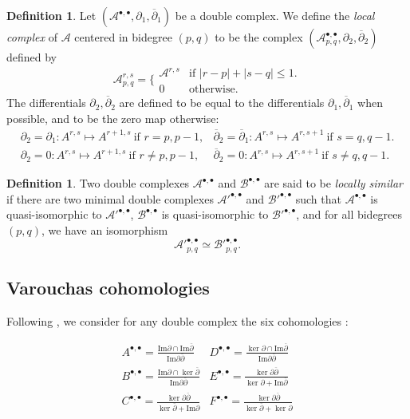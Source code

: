 \documentclass[leqno]{article}
\theoremstyle{definition}
\newtheorem{Definition}[equation]{Definition}
\numberwithin{equation}{section}
\begin{document}
\begin{Definition}
Let $(\mathcal{A}^{\bullet, \bullet}, \partial_1, \overline{\partial}_1)$ be a double complex. We define the {\sl local complex} of $\mathcal{A}$ centered in bidegree $(p, q)$ to be the complex $(\mathcal{A}_{p, q}^{\bullet, \bullet}, \partial_2, \overline{\partial}_2)$ defined by
\[
\mathcal{A}_{p, q}^{r, s}
=
\Bigg\{
\begin{array}{ccc}
\mathcal{A}^{r, s} & \text{if } |r-p| + |s - q| \leqslant 1. \\
0 & \text{otherwise}.
\end{array}
\]
The differentials $\partial_2, \overline{\partial}_2$ are defined to be equal to the differentials $\partial_1, \overline{\partial}_1$ when possible, and to be the zero map otherwise:
\[
\begin{array}{cccc}
\partial_2 = \partial_1 : A^{r, s} \mapsto A^{r+1, s} \ \text{if } r =p, p-1,
&
\overline{\partial}_2 = \overline{\partial}_1 : A^{r, s} \mapsto A^{r, s+1} \ \text{if } s =q, q-1.
\\
\partial_2 = 0 : A^{r, s} \mapsto A^{r+1, s} \ \text{if } r \neq p, p-1,
&
\overline{\partial}_2 = 0 : A^{r, s} \mapsto A^{r, s+1} \ \text{if } s \neq q, q-1.
\end{array}
\]
\end{Definition}
\begin{Definition}
Two double complexes $\mathcal{A}^{\bullet, \bullet}$ and $\mathcal{B}^{\bullet, \bullet}$ are said to be {\sl locally similar} if there are two minimal double complexes $\mathcal{A}'^{\bullet, \bullet}$ and $\mathcal{B}'^{\bullet, \bullet}$ such that $\mathcal{A}^{\bullet, \bullet}$ is quasi-isomorphic to $\mathcal{A}'^{\bullet, \bullet}$, $\mathcal{B}^{\bullet, \bullet}$ is quasi-isomorphic to $\mathcal{B}'^{\bullet, \bullet}$, and for all bidegrees $(p, q)$, we have an isomorphism
\[
\mathcal{A}'^{\bullet, \bullet}_{p, q}
\simeq
\mathcal{B}'^{\bullet, \bullet}_{p, q}.
\]
\end{Definition}

\subsection{Varouchas cohomologies}

Following \cite{JV}, we consider for any double complex the six cohomologies :

\[
\begin{array}{cc}
A^{\bullet, \bullet} = \frac{\text{Im} \partial \cap \text{Im} \overline{\partial}}{\text{Im} \partial \overline{\partial}} 
&
D^{\bullet, \bullet}= \frac{\ker \partial \cap \text{Im} \overline{\partial}}{\text{Im} \partial \overline{\partial}}
\\
B^{\bullet, \bullet} = \frac{\text{Im} \partial \cap \ker \overline{\partial}}{\text{Im} \partial \overline{\partial}}
&
E^{\bullet, \bullet} =  \frac{\ker \partial \overline{\partial}}{\ker \partial + \text{Im} \overline{\partial}}
\\
C^{\bullet, \bullet} = \frac{\ker \partial \overline{\partial}}{\ker \overline{\partial} + \text{Im} \partial}
&
F^{\bullet, \bullet} = \frac{\ker \partial \overline{\partial}}{\ker \overline{\partial} + \ker \partial}
\end{array}
\]
\end{document}
